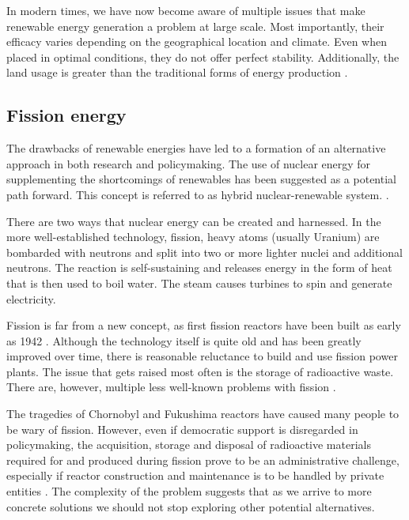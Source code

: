   In modern times, we have now become aware of multiple issues
  that make renewable energy generation a problem at large scale.
  Most importantly, their efficacy varies depending on the geographical
  location and climate. Even when placed in optimal conditions,
  they do not offer perfect stability. Additionally, the land
  usage is greater than the traditional forms of energy production
  \cite{renewable_problems}.

\subsection{Fission energy}

  The drawbacks of renewable energies have led to a formation
  of an alternative approach in both research and policymaking. 
  The use of nuclear energy for supplementing the shortcomings 
  of renewables has been suggested as a potential path forward.
  This concept is referred to as hybrid nuclear-renewable system.
  \cite{hybrid_nuclear_renewable}. 

  There are two ways that nuclear energy can be created and harnessed.
  In the more well-established technology, fission, heavy atoms 
  (usually Uranium) are bombarded with neutrons 
  and split into two or more lighter nuclei and
  additional neutrons. The reaction is self-sustaining 
  and releases energy in the form of heat that is then used
  to boil water. The steam causes turbines to spin
  and generate electricity.


  Fission is far from a new concept, as first fission reactors have been 
  built as early as 1942 \cite{first_fission_reactor}. 
  Although the technology itself is quite old 
  and has been greatly improved over time, 
  there is reasonable reluctance to build and use fission power plants. 
  The issue that gets raised most often is the storage of radioactive waste. 
  There are, however, multiple less well-known
  problems with fission \cite{fission_problems}. 


  The tragedies of Chornobyl and Fukushima reactors
  have caused many people to be wary of fission. However, even if
  democratic support is disregarded in policymaking, the acquisition,
  storage and disposal of radioactive materials required for and produced 
  during fission prove to be an administrative challenge, especially 
  if reactor construction and maintenance is to be handled
  by private entities \cite{fission_tech_and_current_issues}. 
  The complexity of the problem suggests that 
  as we arrive to more concrete solutions we 
  should not stop exploring other potential alternatives.

